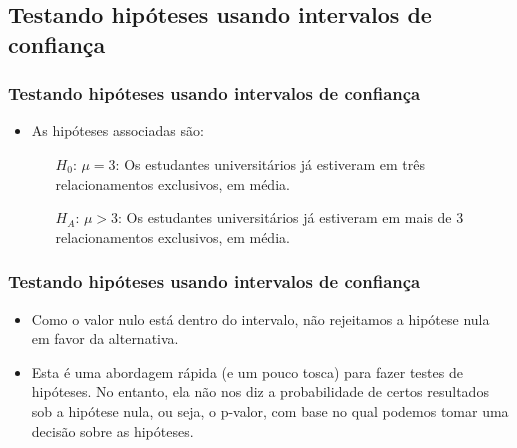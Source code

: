 
\subsection{Testando hipóteses usando intervalos de confiança} 


\begin{frame}
\frametitle{Testando hipóteses usando intervalos de confiança}
\justifying
{}

\pause

\begin{itemize}
\justifying
\item As hipóteses associadas são:
\begin{itemize}
\justifying
\item[$H_0$:] $\mu = 3$: Os estudantes universitários já estiveram em três relacionamentos exclusivos, em média.
\justifying
\item[$H_A$:] $\mu > 3$: Os estudantes universitários já estiveram em mais de 3 relacionamentos exclusivos, em média.
\end{itemize}
\end{itemize}

\end{frame}

\begin{frame}
\frametitle{Testando hipóteses usando intervalos de confiança}

\begin{itemize}
\justifying
\item Como o valor nulo está dentro do intervalo, não rejeitamos a hipótese nula em favor da alternativa.

\pause
\justifying
\item Esta é uma abordagem rápida (e um pouco tosca) para fazer testes de hipóteses. No entanto, ela não nos diz a probabilidade de certos resultados sob a hipótese nula, ou seja, o p-valor, com base no qual podemos tomar uma decisão sobre as hipóteses.

\end{itemize}

\end{frame}

